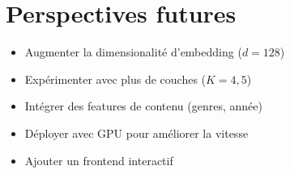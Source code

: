 \documentclass[12pt,a4paper]{report}
\begin{document}
\section{Perspectives futures}

\begin{itemize}
  \item Augmenter la dimensionalité d'embedding ($d = 128$)
  \item Expérimenter avec plus de couches ($K = 4, 5$)
  \item Intégrer des features de contenu (genres, année)
  \item Déployer avec GPU pour améliorer la vitesse
  \item Ajouter un frontend interactif
\end{itemize}

\end{document}
